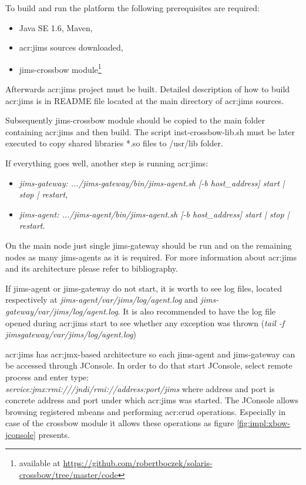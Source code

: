 \documentclass[11pt,openany]{book}
\begin{document}
      To build and run the platform the following prerequisites are required:

      \begin{itemize}
        \item Java SE 1.6, Maven,
        \item \gls{acr:jims} sources downloaded,
        \item jims-crossbow module\footnote{available at \url{https://github.com/robertboczek/solaris-crossbow/tree/master/code}}
      \end{itemize}

      Afterwards \gls{acr:jims} project must be built. Detailed description of how to build \gls{acr:jims} is in README
      file located at the main directory of \gls{acr:jims} sources.

      Subsequently jims-crossbow module should be copied to the main folder containing \gls{acr:jims} and then build. The script
      inst-crossbow-lib.sh must be later executed to copy shared libraries *.so files to /usr/lib folder.

      If everything goes well, another step is running \gls{acr:jims}:

      \begin{itemize}
        \item \textit{jims-gateway: .../jims-gateway/bin/jims-agent.sh [-b host\_address] start | stop | restart},
        \item \textit{jims-agent: .../jims-agent/bin/jims-agent.sh [-b host\_address] start | stop | restart}.
      \end{itemize}

      On the main node just single jims-gateway should be run and on the remaining nodes as many jims-agents as it is
      required. For more information about \gls{acr:jims} and its architecture please refer to bibliography.

      If jims-agent or jims-gateway do not start, it is worth to see log files, located respectively at
      \textit{jims-agent/var/jims/log/agent.log} and \textit{jims-gateway/var/jims/log/agent.log}. 
      It is also  recommended to have the log file opened during \gls{acr:jims} start to see whether any exception was thrown 
      (\textit{tail -f jims\-gateway/var/jims/log/agent.log})

      \gls{acr:jims} has \gls{acr:jmx}-based architecture so each jims-agent and jims-gateway can be accessed through
      JConsole. In order to do that start JConsole, select remote process and enter type: \\
     \textit{service:jmx:rmi:///jndi/rmi://address:port/jims} where address and port is concrete
      address and port under which \gls{acr:jims} was started. The JConsole allows browsing registered mbeans and
      performing \gls{acr:crud} operations. Especially in case of the crossbow module it allows these operations as
      figure \ref{fig:impl:xbow-jconsole} presents.
\end{document}

